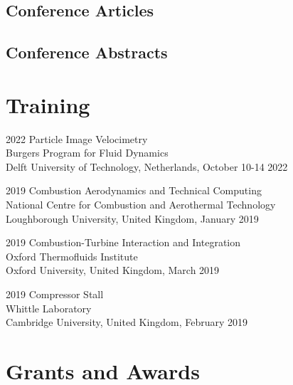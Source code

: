 \documentclass[12pt,letterpaper]{report}
\begin{document}
    \subsection*{Conference Articles}
        \nocite{*}
        \printbibliography[type=inproceedings, heading=none, resetnumbers, notkeyword=abstract,nottype=url,nottype=doi]

     \subsection*{Conference Abstracts}
        \nocite{*}
        \printbibliography[heading=none, resetnumbers, keyword=abstract,nottype=url,nottype=doi]
    
    
       	
    \section*{Training}
    
	\begin{tablist}
	
	\item[2022] \tab{}Particle Image Velocimetry \\ 
	Burgers Program for Fluid Dynamics \\
	Delft University of Technology, Netherlands, October 10-14 2022 
	
	\item[2019] \tab{}Combustion Aerodynamics and Technical Computing \\
	National Centre for Combustion and Aerothermal Technology \\
	Loughborough University, United Kingdom, January 2019
	
	\item[2019] \tab{}Combustion-Turbine Interaction and Integration \\ 
	Oxford Thermofluids Institute \\
	Oxford University, United Kingdom, March 2019
	
	\item[2019] \tab{}Compressor Stall \\ 
	Whittle Laboratory \\
	Cambridge University, United Kingdom, February 2019
	
	
	\end{tablist}

    \section*{Grants and Awards}
\end{document}
